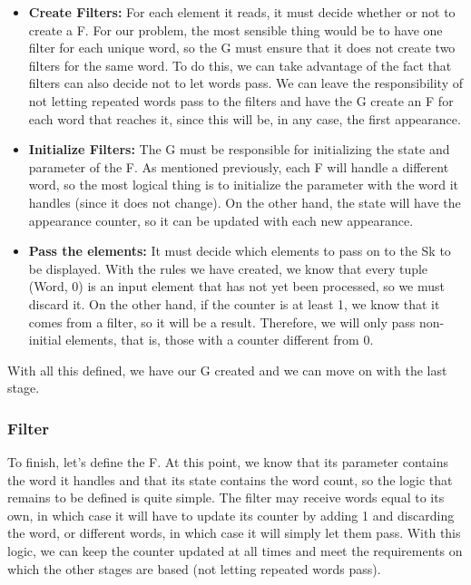 \begin{itemize}
    \item \textbf{Create Filters:} For each element it reads, it must decide whether or not to create a F.
    For our problem, the most sensible thing would be to have one filter for each unique word, so the G must ensure that it does not create two filters for the same word.
    To do this, we can take advantage of the fact that filters can also decide not to let words pass.
    We can leave the responsibility of not letting repeated words pass to the filters and have the G create an F for each word that reaches it, since this will be, in any case, the first appearance.

    \item \textbf{Initialize Filters:} The G must be responsible for initializing the state and parameter of the F.
    As mentioned previously, each F will handle a different word, so the most logical thing is to initialize the parameter with the word it handles (since it does not change).
    On the other hand, the state will have the appearance counter, so it can be updated with each new appearance.

    \item \textbf{Pass the elements:} It must decide which elements to pass on to the Sk to be displayed.
    With the rules we have created, we know that every tuple (Word, 0) is an input element that has not yet been processed, so we must discard it.
    On the other hand, if the counter is at least 1, we know that it comes from a filter, so it will be a result.
    Therefore, we will only pass non-initial elements, that is, those with a counter different from 0.
\end{itemize}

With all this defined, we have our G created and we can move on with the last stage.

\subsubsection*{Filter}
To finish, let's define the F.
At this point, we know that its parameter contains the word it handles and that its state contains the word count, so the logic that remains to be defined is quite simple.
The filter may receive words equal to its own, in which case it will have to update its counter by adding 1 and discarding the word, or different words, in which case it will simply let them pass.
With this logic, we can keep the counter updated at all times and meet the requirements on which the other stages are based (not letting repeated words pass).

